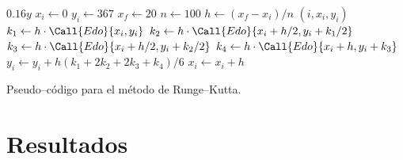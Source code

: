 \documentclass[english,spanish,Ce-table,Ce-theorem]{CabesHW}
\begin{document}
\begin{algorithm}[H]
    \centering
    \begin{myalg}[1]
        \State \Output $0.16 y$
    \EndFunction
    \State \phantom{}
    \State $x_i \gets 0$ 
    \State $y_i \gets 367$ 
    \State $x_f \gets 20$ 
    \State $n \gets 100$ 
    \State \phantom{}
    \State $h \gets (x_f - x_i)/n$ 
        \State \Output $(i, x_i, y_i)$
        \State \phantom{}
        \State $k_1 \gets h\cdot\Call{Edo}{x_i, y_i}$
        \State $k_2 \gets h\cdot\Call{Edo}{x_i+h/2, y_i+k_1/2}$
        \State $k_3 \gets h\cdot\Call{Edo}{x_i+h/2, y_i+k_2/2}$
        \State $k_4 \gets h\cdot\Call{Edo}{x_i+h, y_i+k_3}$
        \State \phantom{}
        \State $y_i \gets y_i + h(k_1 + 2k_2 + 2k_3 + k_4)/6$
        \State $x_i \gets x_i + h$
    \EndFor
    \end{myalg}
    \caption{Pseudo--código para el método de Runge--Kutta.}
    \label{alg:runge-kutta}
\end{algorithm}

\section{Resultados}
\end{document}
